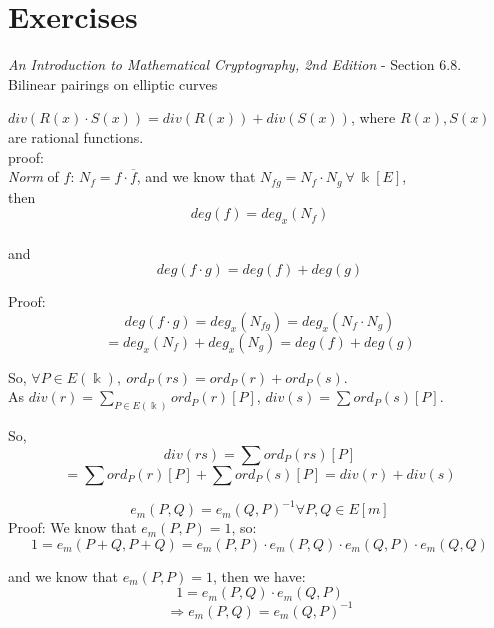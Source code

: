 \documentclass{article}
\theoremstyle{definition}
\newenvironment{solution}[1]
{\renewcommand\theinnersolution{#1}\innersolution}
{\endinnersolution}
\begin{document}
\section{Exercises}
\emph{An Introduction to Mathematical Cryptography, 2nd Edition} - Section 6.8. Bilinear pairings on elliptic curves

\begin{solution}{6.29}
  $div(R(x) \cdot S(x)) = div( R(x)) + div( S(x))$, where $R(x), S(x)$ are rational functions.
  \\proof:\\
  \emph{Norm} of $f$: $N_f = f \cdot \overline{f}$, and we know that $N_{fg} = N_f \cdot N_g~\forall~\Bbbk[E]$,\\
  then $$deg(f) = deg_x(N_f)$$\\
  and $$deg(f \cdot g) = deg(f) + deg(g)$$

  Proof:
  $$deg(f \cdot g) = deg_x(N_{fg}) = deg_x(N_f \cdot N_g)$$
  $$= deg_x(N_f) + deg_x(N_g) = deg(f) + deg(g)$$

  So, $\forall P \in E(\Bbbk),~ ord_P(rs) = ord_P(r) + ord_P(s)$.\\
  As $div(r) = \sum_{P\in E(\Bbbk)} ord_P(r)[P]$, $div(s) = \sum ord_P(s)[P]$.

  So,
  $$div(rs) = \sum ord_P(rs)[P]$$
  $$= \sum ord_P(r)[P] + \sum ord_P(s)[P] = div(r) + div(s)$$
\end{solution}

\vspace{0.5cm}

\begin{solution}{6.31}
  $$e_m(P, Q) = e_m(Q, P)^{-1} \forall P, Q \in E[m]$$
  Proof:
  We know that $e_m(P, P) = 1$, so:
  $$1 = e_m(P+Q, P+Q) = e_m(P, P) \cdot e_m(P, Q) \cdot e_m(Q, P) \cdot e_m(Q, Q)$$

  and we know that $e_m(P, P) = 1$, then we have:
  $$1 = e_m(P, Q) \cdot e_m(Q, P)$$
  $$\Longrightarrow e_m(P, Q) = e_m(Q, P)^{-1}$$
\end{solution}
\end{document}
